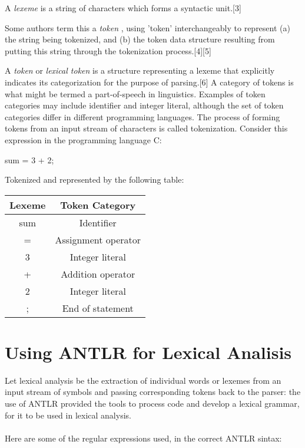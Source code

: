 \documentclass[twocolumn,10ptr]{article}
\begin{document}
A  \textit{lexeme}  is a string of characters which forms a syntactic unit.[3]

Some authors term this a  \textit{token} , using 'token' interchangeably to represent (a) the string being tokenized, and (b) the token data structure resulting from putting this string through the tokenization process.[4][5]

A \textit{token}  or \textit{lexical token}  is a structure representing a lexeme that explicitly indicates its categorization for the purpose of parsing.[6] A category of tokens is what might be termed a part-of-speech in linguistics. Examples of token categories may include identifier and integer literal, although the set of token categories differ in different programming languages. The process of forming tokens from an input stream of characters is called tokenization. Consider this expression in the programming language C:

sum = 3 + 2;

Tokenized and represented by the following table:


\begin{center}
 \begin{tabular}{||c c||} 
 \hline
Lexeme & Token Category\\ [0.5ex] 
 \hline\hline
sum	&	Identifier  \\ 
 \hline
=	&	Assignment operator  \\ 
 \hline
3	&	Integer literal  \\ 
 \hline
+	&	Addition operator  \\ 
 \hline
2	&	Integer literal  \\ 
 \hline
;	&	End of statement  \\ [1ex] 
 \hline
\end{tabular}
\end{center}



\section{Using ANTLR for Lexical Analisis}
Let lexical analysis be the extraction of individual words or lexemes from an input stream of symbols and passing corresponding tokens back to the parser: the use of ANTLR provided the tools to process code and develop a lexical grammar, for it to be used in lexical analysis.\\\\
Here are some of the regular expressions used, in the correct ANTLR sintax:\\
\end{document}
